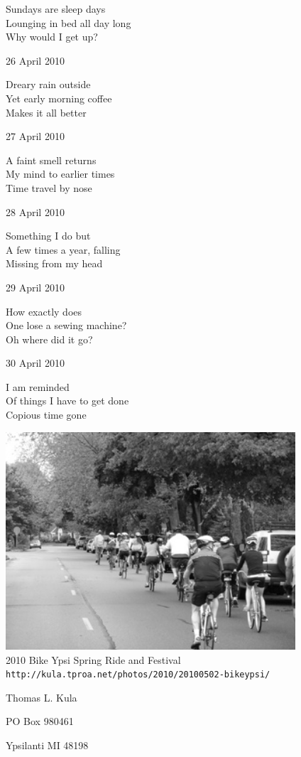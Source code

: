\documentclass[12pt]{article}
\begin{document}
Sundays are sleep days \\
Lounging in bed all day long \\
Why would I get up?

26 April 2010

Dreary rain outside \\
Yet early morning coffee \\
Makes it all better

27 April 2010

A faint smell returns \\
My mind to earlier times \\
Time travel by nose

28 April 2010

Something I do but \\
A few times a year, falling \\
Missing from my head

29 April 2010

How exactly does \\
One lose a sewing machine? \\
Oh where did it go?

30 April 2010

I am reminded \\
Of things I have to get done \\
Copious time gone




\newpage

\begin{center}
\includegraphics[width=4.25in]{bike-ypsi.jpg} \\[1cm]

2010 Bike Ypsi Spring Ride and Festival
\small{{\tt http://kula.tproa.net/photos/2010/20100502-bikeypsi/}}

\end{center}

\newpage

\thispagestyle{empty}
\vspace*{14cm}
\begin{sideways}
\Large{Thomas L. Kula}
\end{sideways}
\begin{sideways}
\Large{PO Box 980461}
\end{sideways}
\begin{sideways}
\Large{Ypsilanti MI 48198}
\end{sideways}
\end{document}
